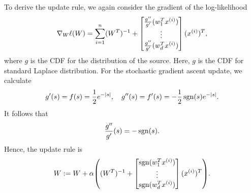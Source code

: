 \documentclass[12pt,letterpaper,boxed]{hmcpset}
\begin{document}
\begin{solution}
\begin{enumerate}[(a)]
    To derive the update rule, we again consider the gradient of the log-likelihood 
    \[
    \nabla_W \ell(W) = \sum_{i=1}^n (W^{T})^{-1} + \begin{bmatrix}
      \frac{g''}{g'} (w_1^T \xx) \\
      \vdots \\
      \frac{g''}{g'} (w_d^T \xx)
    \end{bmatrix}
    (\xx)^T,
    \]
    where $g$ is the CDF for the distribution of the source. Here, $g$ is the CDF for standard Laplace distribution. For the stochastic gradient ascent update, we calculate
    \[
    g'(s) = f(s) = \frac{1}{2} e^{-\left\lvert s\right\rvert}, \quad 
    g''(s) = f'(s) = - \frac{1}{2} \operatorname{sgn}(s) e^{- \left\lvert s\right\rvert}.
    \]
    It follows that
    \[
    \frac{g''}{g'}(s) = - \operatorname{sgn}(s).
    \]
    Hence, the update rule is
    \[
    W := W + \alpha \qty( (W^T)^{-1} + 
      \begin{bmatrix}
        \sgn(w_1^T \xx) \\
        \vdots \\
        \sgn(w_d^T \xx)
      \end{bmatrix}
      (\xx)^T
    ).
    \]
  \end{enumerate}
\end{solution}
\end{document}

